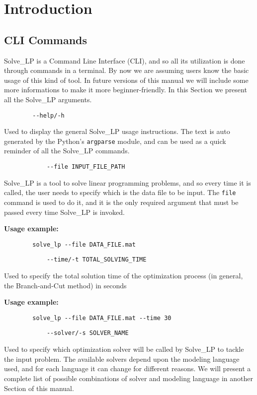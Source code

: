 \documentclass[12pt,hidelinks]{article}
\begin{document}
\section{Introduction}
\vspace{10.5cm}
	\subsection{CLI Commands}
	Solve\_LP is a Command Line Interface (CLI), and so all its utilization is done through commands in a terminal. By now we are assuming users know the basic usage of this kind of tool. In future versions of this manual we will include some more informations to make it more beginner-friendly. In this Section we present all the Solve\_LP arguments.

	{\color{mordantred19}
	\begin{verbatim}
		--help/-h
	\end{verbatim}
	} Used to display the general Solve\_LP usage instructions. The text is auto generated by the Python's \texttt{argparse} module, and can be used as a quick reminder of all the Solve\_LP commands.

	{\color{mordantred19}
		\begin{verbatim}
			--file INPUT_FILE_PATH
		\end{verbatim}
	} Solve\_LP is a tool to solve linear programming problems, and so every time it is called, the user needs to specify which is the data file to be input. The \texttt{file} command is used to do it, and it is the only required argument that must be passed every time Solve\_LP is invoked.

	\textbf{Usage example:} 
	\begin{verbatim}
		solve_lp --file DATA_FILE.mat
	\end{verbatim}

	{\color{mordantred19}
		\begin{verbatim}
			--time/-t TOTAL_SOLVING_TIME
		\end{verbatim}
	} Used to specify the total solution time of the optimization process (in general, the Branch-and-Cut method) in seconds
	
	\textbf{Usage example:} 
	\begin{verbatim}
		solve_lp --file DATA_FILE.mat --time 30
	\end{verbatim}

	{\color{mordantred19}
		\begin{verbatim}
			--solver/-s SOLVER_NAME
		\end{verbatim}
	} Used to specify which optimization solver will be called by Solve\_LP to tackle the input problem. The available solvers depend upon the modeling language used, and for each language it can change for different reasons. We will present a complete list of possible combinations of solver and modeling language in another Section of this manual.
	
\end{document}
